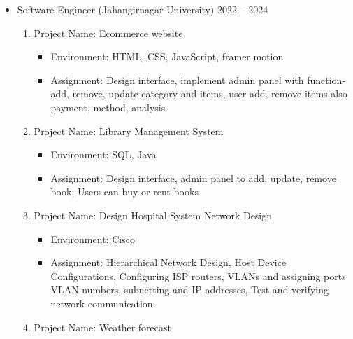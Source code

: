 \documentclass[a4paper,10pt]{article}
\begin{document}
\begin{itemize}

    \vspace{1em}
    
    \item {Software Engineer (Jahangirnagar University)}  \hfill { 2022 --  2024} \\[0.5em] 
    \begin{enumerate}[label=\Roman*.]
        \item {Project Name:} Ecommerce website \\[0.5em]
              \begin{itemize}[]
                  \item {Environment:} HTML, CSS, JavaScript, framer motion \\[0.5em]
                  \item {Assignment:} Design interface, implement admin panel with function- add, remove, update category and items, user add, remove items also payment, method, analysis. \\[1em]
              \end{itemize}
        \item {Project Name:} Library Management System \\[0.5em]
              \begin{itemize}[]
                  \item {Environment:} SQL, Java \\[0.5em]
                  \item {Assignment:} Design interface, admin panel to add, update, remove book, Users can buy or rent books. \\[1em]
              \end{itemize}
        \item {Project Name:} Design Hospital System Network Design \\[0.5em]
              \begin{itemize}[]
                  \item {Environment:} Cisco \\[0.5em]
                  \item {Assignment:} Hierarchical Network Design, Host Device Configurations, Configuring ISP routers, VLANs and assigning ports VLAN numbers, subnetting and IP addresses, Test and verifying network communication. \\[1em]
              \end{itemize}
        \item {Project Name:} Weather forecast \\[0.5em]

\end{enumerate}
\end{itemize}
\end{document}
